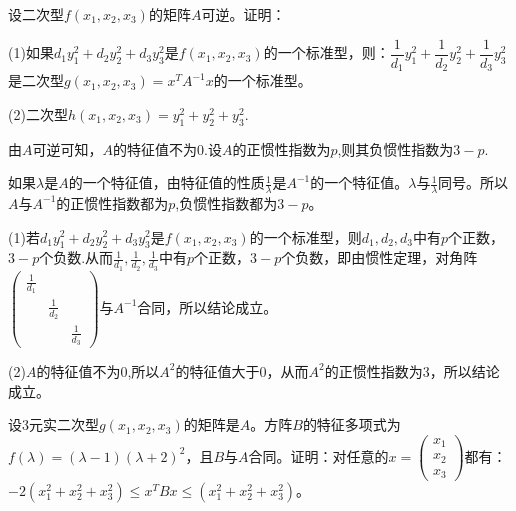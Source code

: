 \documentclass[a4paper]{report}
\begin{document}
\EX 设二次型$f(x_1,x_2,x_3)$的矩阵$A$可逆。证明：

(1)如果$d_1y_1^2+d_2y_2^2+d_3y_3^2$是$f(x_1,x_2,x_3)$的一个标准型，则：$
\dfrac{1}{d_1}y_1^2+\dfrac{1}{d_2}y_2^2+\dfrac{1}{d_3}y_3^2
$是二次型$g(x_1,x_2,x_3)=x^TA^{-1}x$的一个标准型。

(2)二次型$h(x_1,x_2,x_3)=y_1^2+y_2^2+y_3^2$.

\begin{zhengming}
由$A$可逆可知，$A$的特征值不为0.设$A$的正惯性指数为$p$,则其负惯性指数为$3-p$.

如果$\lambda$是$A$的一个特征值，由特征值的性质$\frac{1}{\lambda}$是$A^{-1}$的一个特征值。$\lambda$与$\frac{1}{\lambda}$同号。所以$A$与$A^{-1}$的正惯性指数都为$p$,负惯性指数都为$3-p$。

(1)若$d_1y_1^2+d_2y_2^2+d_3y_3^2$是$f(x_1,x_2,x_3)$的一个标准型，则$d_1,d_2,d_3$中有$p$个正数，$3-p$个负数.从而$\frac{1}{d_1},\frac{1} {d_2},\frac{1} {d_3}$中有$p$个正数，$3-p$个负数，即由惯性定理，对角阵
$
\begin{pmatrix}
\frac{1} {d_1}\\&\frac{1} {d_2}\\&&\frac{1} {d_3}
\end{pmatrix}
$与$A^{-1}$合同，所以结论成立。

(2)$A$的特征值不为0,所以$A^2$的特征值大于0，从而$A^2$的正惯性指数为$3$，所以结论成立。
\end{zhengming}

\EX 设3元实二次型$g(x_1,x_2,x_3)$的矩阵是$A$。方阵$B$的特征多项式为$f(\lambda)=(\lambda-1)(\lambda+2)^2$，且$B$与$A$合同。证明：对任意的$x
=\begin{pmatrix}
x_1\\ x_2\\x_3
 \end{pmatrix}
$都有：
$-2(x_1^2+x_2^2+x_3^2)\leq x^TBx\leq(x_1^2+x_2^2+x_3^2)$。
\end{document}
